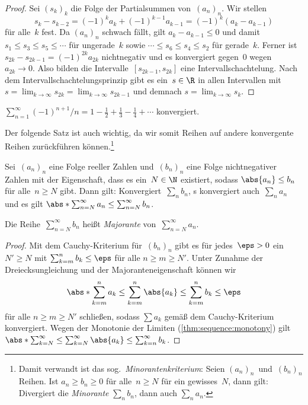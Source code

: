 \documentclass[a4paper]{article}
\begin{document}
\begin{proof}
    Sei $(s_k)_k$ die Folge der Partialsummen von~$(a_n)_n$. Wir stellen
    \begin{equation*}
        s_k - s_{k-2} = (-1)^k a_k + (-1)^{k-1} a_{k-1} = (-1)^k (a_k-a_{k-1})
    \end{equation*}
    für alle~$k$ fest. Da $(a_n)_n$ schwach fällt, gilt $a_k - a_{k-1} \leq 0$ und damit $s_1 \leq s_3 \leq s_5 \leq \cdots$ für ungerade~$k$ sowie $\cdots \leq s_6 \leq s_4 \leq s_2$ für gerade~$k$. Ferner ist $s_{2k} - s_{2k-1} = (-1)^{2k} a_{2k}$ nichtnegativ und es konvergiert gegen~$0$ wegen~$a_{2k} \to 0$. Also bilden die Intervalle~$[s_{2k-1}, s_{2k}]$ eine Intervallschachtelung. Nach dem Intervallschachtelungsprinzip gibt es ein~$s \in \R$ in allen Intervallen mit $s = \lim_{k\to\infty} s_{2k} = \lim_{k\to\infty} s_{2k-1}$ und demnach $s = \lim_{k\to\infty} s_k$.
\end{proof}

\begin{example}
    $\sum_{n=1}^\infty (-1)^{n+1}/n = 1 - \frac{1}{2} + \frac{1}{3} - \frac{1}{4} + \cdots$ konvergiert.
\end{example}

Der folgende Satz ist auch wichtig, da wir somit Reihen auf andere konvergente Reihen zurückführen können.\footnote{Damit verwandt ist das sog.\ \emph{Minorantenkriterium}: Seien $(a_n)_n$~und~$(b_n)_n$ Reihen. Ist $a_n \geq b_n \geq 0$ für alle~$n \geq N$ für ein gewisses~$N$, dann gilt: Divergiert die \emph{Minorante} $\sum_n b_n$, dann auch $\sum_n a_n$.}

\begin{theorem}[Majorantenkriterium]
    Sei~$(a_n)_n$ eine Folge reeller Zahlen und~$(b_n)_n$ eine Folge nichtnegativer Zahlen mit der Eigenschaft, dass es ein~$N \in \N$ existiert, sodass $\abs{a_n} \leq b_n$ für alle~$n \geq N$ gibt. Dann gilt: Konvergiert~$\sum_n b_n$, s konvergiert auch~$\sum_n a_n$ und es gilt $\abs*{\sum_{n=N}^\infty a_n} \leq \sum_{n=N}^\infty b_n$.

    Die Reihe~$\sum_{n=N}^\infty b_n$ heißt \emph{Majorante} von~$\sum_{n=N}^\infty a_n$.
\end{theorem}

\begin{proof}
    Mit dem Cauchy-Kriterium für~$(b_n)_n$ gibt es für jedes~$\eps > 0$ ein~$N' \geq N$ mit $\sum_{k=m}^n b_k \leq \eps$ für alle $n \geq m \geq N'$. Unter Zunahme der Dreiecksungleichung und der Majoranteneigenschaft können wir
    \begin{equation*}
        \abs*{\sum_{k=m}^n a_k} \leq \sum_{k=m}^n \abs{a_k} \leq \sum_{k=m}^n b_k \leq \eps
    \end{equation*}
    für alle $n \geq m \geq N'$ schließen, sodass $\sum a_k$ gemäß dem Cauchy-Kriterium konvergiert. Wegen der Monotonie der Limiten (\cref{thm:sequence:monotony}) gilt $\abs*{\sum_{k=N}^\infty} \leq \sum_{k=N}^\infty \abs{a_k} \leq \sum_{k=n}^\infty b_k$.
\end{proof}
\end{document}
